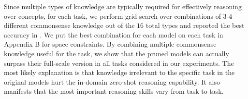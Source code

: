 Since multiple types of knowledge are typically required for effectively 
reasoning over concepts, for each task, we perform grid search over 
combinations of $3$-$4$ different commonsense knowledge out of 
the $16$ total types and reported the best accuracy in . 
We put the best combination for each model on each task in Appendix B
for space constraints. By combining multiple commonsense knowledge useful for the task, 
we show that the pruned models can actually surpass their full-scale 
version in all tasks considered in our experiments. 
The most likely explanation is that knowledge irrelevant to the specific task 
in the original models hurt the in-domain zero-shot reasoning capability. 
It also manifests that the most important reasoning skills vary from 
task to task.
